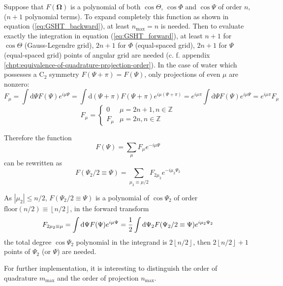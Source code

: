 Suppose that $F(\mathbf{\Omega})$ is a polynomial of both $\cos\Theta$,
$\cos\Phi$ and $\cos\Psi$ of order $n$, ($n+1$ polynomial terms).
To expand completely this function as shown in equation (\ref{eq:GSHT_backward}),
at least $n_{\mathrm{max}}=n$ is needed. Then to evaluate exactly
the integration in equation (\ref{eq:GSHT_forward}), at least $n+1$
for $\cos\Theta$ (Gauss-Legendre grid), $2n+1$ for $\Phi$ (equal-spaced
grid), $2n+1$ for $\Psi$ (equal-spaced grid) points of angular grid
are needed (c. f. appendix \ref{chpt:equivalence-of-quadrature-projection-order}).
In the case of water which possesses a $\mathrm{C}_{2}$ symmetry
$F(\Psi+\pi)=F(\Psi)$, only projections of even $\mu$ are nonzero:
\begin{equation}
F_{\mu}=\int\mathrm{d}\Psi F(\Psi)e^{i\mu\Psi}=\int\mathrm{d}(\Psi+\pi)F(\Psi+\pi)e^{i\mu(\Psi+\pi)}=e^{i\mu\pi}\int\mathrm{d}\Psi F(\Psi)e^{i\mu\Psi}=e^{i\mu\pi}F_{\mu}
\end{equation}
\begin{equation}
F_{\mu}=\begin{cases}
0 & \mu=2n+1,n\in\mathbb{Z}\\
F_{\mu} & \mu=2n,n\in\mathbb{Z}
\end{cases}
\end{equation}


Therefore the function
\begin{equation}
F(\Psi)=\sum_{\mu}F_{\mu}e^{-i\mu\Psi}
\end{equation}
can be rewritten as
\begin{equation}
F(\Psi_{2}/2\equiv\Psi)=\sum_{\mu_{2}\equiv\mu/2}F_{2\mu_{2}}e^{-i\mu_{2}\Psi_{2}}
\end{equation}


As $\left|\mu_{2}\right|\leq n/2$, $F(\Psi_{2}/2\equiv\Psi)$ is
a polynomial of $\cos\Psi_{2}$ of order $\mathrm{floor}(n/2)\equiv\left\lfloor n/2\right\rfloor $,
in the forward transform
\begin{equation}
F_{2\mu_{2}\equiv\mu}=\intop\mathrm{d}\Psi F(\Psi)e^{i\mu\Psi}=\frac{1}{2}\intop\mathrm{d}\Psi_{2}F(\Psi_{2}/2\equiv\Psi)e^{i\mu_{2}\Psi_{2}}
\end{equation}
the total degree $\cos\Psi_{2}$ polynomial in the integrand is $2\left\lfloor n/2\right\rfloor $,
then $2\left\lfloor n/2\right\rfloor +1$ points of $\Psi_{2}$ (or
$\Psi$) are needed. 

For further implementation, it is interesting to distinguish the order
of quadrature $m_{\mathrm{max}}$ and the order of projection $n_{\mathrm{max}}$.


